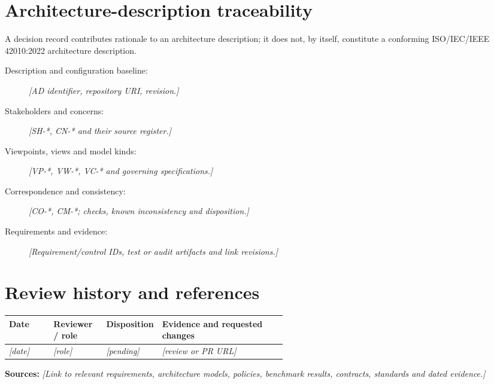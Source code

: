 \documentclass[11pt,letterpaper]{article}
\begin{document}
\section{Architecture-description traceability}
A decision record contributes rationale to an architecture description; it
does not, by itself, constitute a conforming ISO/IEC/IEEE 42010:2022
architecture description.
\begin{description}
\item[Description and configuration baseline:] \emph{[AD identifier, repository URI, revision.]}
\item[Stakeholders and concerns:] \emph{[SH-*, CN-* and their source register.]}
\item[Viewpoints, views and model kinds:] \emph{[VP-*, VW-*, VC-* and governing specifications.]}
\item[Correspondence and consistency:] \emph{[CO-*, CM-*; checks, known inconsistency and disposition.]}
\item[Requirements and evidence:] \emph{[Requirement/control IDs, test or audit artifacts and link revisions.]}
\end{description}

\section{Review history and references}
\begin{tabularx}{\linewidth}{@{}p{0.16\linewidth}p{0.19\linewidth}p{0.19\linewidth}X@{}}
\toprule
\textbf{Date} & \textbf{Reviewer / role} & \textbf{Disposition} & \textbf{Evidence and requested changes}\\
\midrule
\emph{[date]} & \emph{[role]} & \emph{[pending]} & \emph{[review or PR URL]}\\
\bottomrule
\end{tabularx}\par

\noindent\textbf{Sources:} \emph{[Link to relevant requirements, architecture
models, policies, benchmark results, contracts, standards and dated evidence.]}
\end{document}
